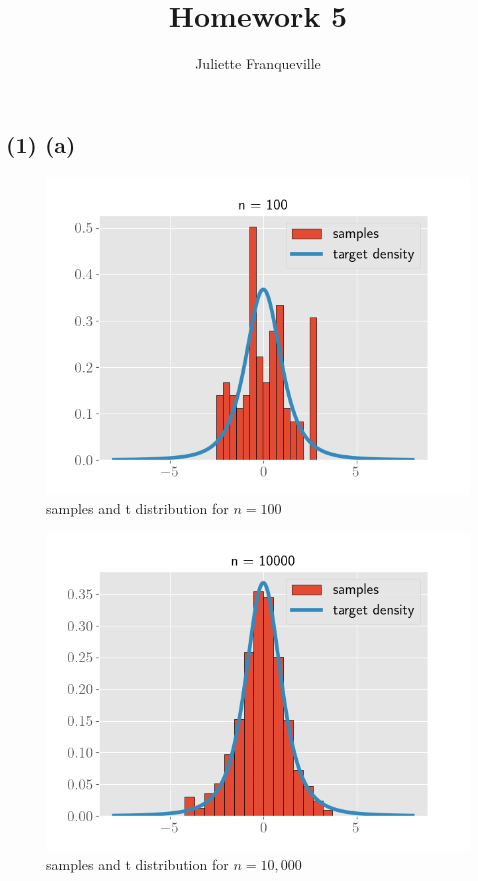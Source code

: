 \documentclass[11pt]{article}
\begin{document}
 
\title{Homework 5}
\author{Juliette Franqueville\\
}
\maketitle

\subsection*{(1) (a)}


\begin{figure}[!h]
    \centering
    \includegraphics[scale=.5
    ]{../figures/resamples_n_100.png}
    \caption{samples and t distribution for $n=100$}
    \label{fig:my_label}
\end{figure}

\begin{figure}[!h]
    \centering
    \includegraphics[scale=.5
    ]{../figures/resamples_n_10000.png}
    \caption{samples and t distribution for $n=10,000$}
    \label{fig:my_label}
\end{figure}
\newpage
\end{document}
